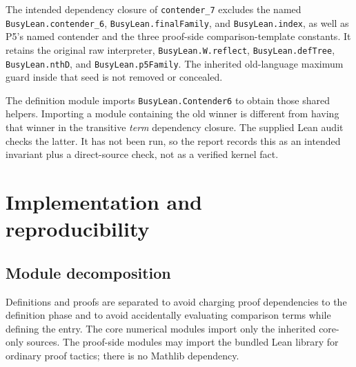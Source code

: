 \documentclass[11pt,letterpaper]{article}
\theoremstyle{definition}
\newcommand{\code}[1]{\nolinkurl{#1}}
\begin{document}
The intended dependency closure of \code{contender_7} excludes the named
\code{BusyLean.contender_6}, \code{BusyLean.finalFamily}, and
\code{BusyLean.index}, as well as P5's named contender and the three proof-side
comparison-template constants. It retains the original raw interpreter,
\code{BusyLean.W.reflect}, \code{BusyLean.defTree}, \code{BusyLean.nthD}, and
\code{BusyLean.p5Family}. The inherited old-language maximum guard inside
that seed is not removed or concealed.

The definition module imports \code{BusyLean.Contender6} to obtain those shared
helpers. Importing a module containing the old winner is different from having
that winner in the transitive \emph{term} dependency closure. The supplied
Lean audit checks the latter. It has not been run, so the report records this
as an intended invariant plus a direct-source check, not as a verified kernel
fact.

\section{Implementation and reproducibility}
\label{sec:implementation}

\subsection{Module decomposition}

Definitions and proofs are separated to avoid charging proof dependencies to
the definition phase and to avoid accidentally evaluating comparison terms
while defining the entry. The core numerical modules import only the inherited
core-only sources. The proof-side modules may import the bundled Lean library
for ordinary proof tactics; there is no Mathlib dependency.
\end{document}
